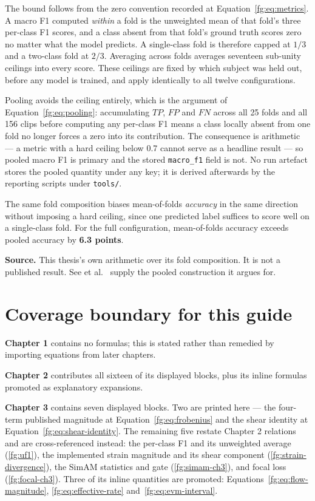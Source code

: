 \documentclass[11pt,a4paper]{article}
\numberwithin{equation}{section}
\begin{document}
The bound follows from the zero convention recorded at
Equation~\eqref{fg:eq:metrics}. A macro F1 computed \emph{within} a fold is
the unweighted mean of that fold's three per-class F1 scores, and a class
absent from that fold's ground truth scores zero no matter what the model
predicts. A single-class fold is therefore capped at $1/3$ and a two-class
fold at $2/3$. Averaging across folds averages seventeen sub-unity ceilings
into every score. These ceilings are fixed by which subject was held out,
before any model is trained, and apply identically to all twelve
configurations.

Pooling avoids the ceiling entirely, which is the argument of
Equation~\eqref{fg:eq:pooling}: accumulating $TP$, $FP$ and $FN$ across all 25
folds and all 156 clips before computing any per-class F1 means a class
locally absent from one fold no longer forces a zero into its contribution.
The consequence is arithmetic --- a metric with a hard ceiling below 0.7
cannot serve as a headline result --- so pooled macro F1 is primary and the
stored \texttt{macro\_f1} field is not. No run artefact stores the pooled
quantity under any key; it is derived afterwards by the reporting scripts
under \texttt{tools/}.

The same fold composition biases mean-of-folds \emph{accuracy} in the same
direction without imposing a hard ceiling, since one predicted label suffices
to score well on a single-class fold. For the full configuration, mean-of-folds
accuracy exceeds pooled accuracy by \textbf{6.3 points}.

\textbf{Source.} This thesis's own arithmetic over its fold composition. It is
not a published result. See et al.~\cite{see2019} supply the pooled
construction it argues for.


\section{Coverage boundary for this guide}
\label{fg:coverage}

\textbf{Chapter 1} contains no formulas; this is stated rather than remedied
by importing equations from later chapters.

\textbf{Chapter 2} contributes all sixteen of its displayed blocks, plus its
inline formulas promoted as explanatory expansions.

\textbf{Chapter 3} contains seven displayed blocks. Two are printed here ---
the four-term published magnitude at Equation~\eqref{fg:eq:frobenius} and the
shear identity at Equation~\eqref{fg:eq:shear-identity}. The remaining five
restate Chapter 2 relations and are cross-referenced instead: the per-class F1
and its unweighted average (\autoref{fg:uf1}), the implemented strain
magnitude and its shear component (\autoref{fg:strain-divergence}), the SimAM
statistics and gate (\autoref{fg:simam-ch3}), and focal loss
(\autoref{fg:focal-ch3}). Three of its inline quantities are promoted:
Equations~\eqref{fg:eq:flow-magnitude}, \eqref{fg:eq:effective-rate}
and~\eqref{fg:eq:evm-interval}.
\end{document}
